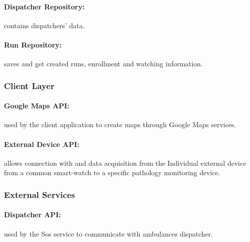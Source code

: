 \documentclass[a4paper]{article}
\begin{document}
    \paragraph{Dispatcher Repository:}
    contains dispatchers' data.
    
    \paragraph{Run Repository:}
    saves and get created runs, enrollment and watching information.
    
    \subsubsection{Client Layer}
    
    \paragraph{Google Maps API:}
    used by the client application to create maps through Google Maps services.
    
    \paragraph{External Device API:}
    allows connection with and data acquisition from the Individual external device from a common smart-watch to a specific pathology monitoring device.
    
    \subsubsection{External Services}
    \paragraph{Dispatcher API:}
    used by the Sos service to communicate with ambulances dispatcher.

\newpage
\end{document}
